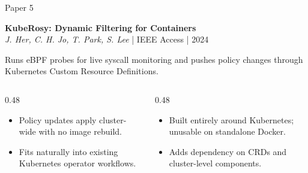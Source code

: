 \documentclass[aspectratio=169,11pt]{beamer}
\begin{document}
\begin{frame}{Paper 5}
\vspace{0.4cm}
\begin{center}
{\Large\bfseries KubeRosy: Dynamic Filtering for Containers}\\[0.15cm]
{\small\color{DarkGray}\textit{J. Her, C. H. Jo, T. Park, S. Lee} | IEEE Access | 2024}
\end{center}

\vspace{0.2cm}
{\small Runs eBPF probes for live syscall monitoring and pushes policy changes through Kubernetes Custom Resource Definitions.}

\vspace{0.2cm}
\begin{columns}[T,onlytextwidth]
\begin{column}{0.48\textwidth}
\begin{tcolorbox}[colback=green!5,colframe=green!50!black,title={\textcolor{green!50!black}{\faCheckCircle}~Where It Wins},fonttitle=\bfseries\small,boxrule=0.5pt,arc=2mm,left=2mm,right=2mm,top=1mm,bottom=1mm]
\footnotesize
\begin{itemize}
  \item Policy updates apply cluster-wide with no image rebuild.
  \item Fits naturally into existing Kubernetes operator workflows.
\end{itemize}
\end{tcolorbox}
\end{column}

\begin{column}{0.48\textwidth}
\begin{tcolorbox}[colback=red!5,colframe=red!50!black,title={\textcolor{red}{\faTimesCircle}~Where It Struggles},fonttitle=\bfseries\small,boxrule=0.5pt,arc=2mm,left=2mm,right=2mm,top=1mm,bottom=1mm]
\footnotesize
\begin{itemize}
  \item Built entirely around Kubernetes; unusable on standalone Docker.
  \item Adds dependency on CRDs and cluster-level components.
\end{itemize}
\end{tcolorbox}
\end{column}
\end{columns}
\end{frame}
\end{document}
